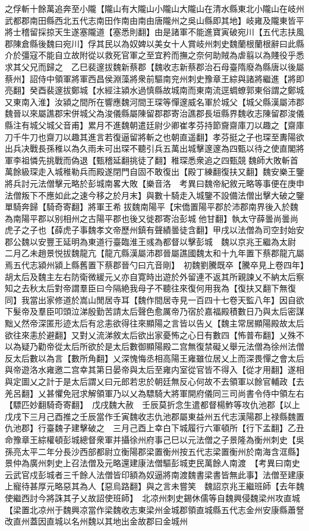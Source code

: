 之俘斬十餘萬追奔至小隴【隴山有大隴山小隴山大隴山在清水縣東北小隴山在岐州武都郡南田縣西北五代志南田作南由南由唐隴州之吳山縣即其地】岐雍及隴東皆平將士稽留採掠天生遂塞隴道【塞悉則翻】由是諸軍不能進寶寅破宛川【五代志扶風郡陳倉縣後魏曰宛川】俘其民以為奴婢以美女十人賞岐州刺史魏蘭根蘭根辭曰此縣介於彊寇不能自立故附從以救死官軍之至宜矜而撫之奈何助賊為虐翦以為賤役乎悉求其父兄而歸之　乙巳裴邃拔魏新蔡郡【魏收志新蔡郡治石母臺隋廢為縣唐以後屬蔡州】詔侍中領軍將軍西昌侯淵藻將衆前驅南兖州刺史豫章王綜與諸將繼進【將即亮翻】癸酉裴邃拔鄭城【水經注潁水過慎縣故城南而東南流逕蜩蟟郭東俗謂之鄭城又東南入淮】汝潁之間所在響應魏河間王琛等憚邃威名軍於城父【城父縣漢屬沛郡魏晉以來屬譙郡宋併城父為浚儀縣屬陳留郡郡寄治譙郡長垣縣界魏收志陳留郡浚儀縣注有城父城父音甫】累月不進魏朝遣廷尉少卿崔孝芬持節齎齋庫刀以趣之【齋庫刀千牛刀也齋刀以趣其進言若復逼留將斬之也朝直遥翻】孝芬挺之子也琛至夀陽欲出兵决戰長孫稚以為久雨未可出琛不聽引兵五萬出城擊邃邃為四甄以待之使直閣將軍李祖憐先挑戰而偽退【甄稽延翻挑徒了翻】稚琛悉衆追之四甄競魏師大敗斬首萬餘級琛走入城稚勒兵而殿遂閉門自固不敢復出【殿丁練翻復扶又翻】魏安樂王鑒將兵討元法僧擊元略於彭城南畧大敗【樂音洛　考異曰魏帝紀敘元略等事便在庚申法僧叛下不應如此之速今移之於月末】與數十騎走入城鑒不設備法僧出擊大破之鑒單騎奔歸【騎奇寄翻】將軍王希拔魏南陽平【宋僑置陽平郡於沛郡南界後入於魏為南陽平郡以别相州之古陽平郡也後又徙郡寄治彭城他甘翻】執太守薛曇尚曇尚虎子之子也【薛虎子事魏孝文帝歷州鎮有聲績曇徒含翻】甲戌以法僧為司空封始安郡公魏以安豐王延明為東道行臺臨淮王彧為都督以擊彭城　魏以京兆王繼為太尉　二月乙未趙景悦拔魏龍亢【龍亢縣漢屬沛郡晉屬譙國魏太和十九年置下蔡郡龍亢屬焉五代志潁州潁上縣舊置下蔡郡晉勺曰亢音剛】　初魏劉騰既卒【騰卒見上卷四年】胡太后及魏主左右防衛微緩元乂亦自寛時出遊於外留連不返其所親諫乂不納太后察知之去秋太后對帝謂羣臣曰今隔絶我母子不聽往來復何用我為【復扶又翻下無復同】我當出家修道於嵩山閒居寺耳【魏作間居寺見一百四十七卷天監八年】因自欲下髮帝及羣臣叩頭泣涕殷勤苦請太后聲色愈厲帝乃宿於嘉福殿積數日乃與太后密謀黜乂然帝深匿形迹太后有忿恚欲得往來顯陽之言皆以告乂【魏主常居顯陽殿故太后欲往來恚於避翻】又對乂流涕敘太后欲出家憂怖之心日有數四【怖普布翻】乂殊不以為疑乃勸帝從太后所欲於是太后數御顯陽殿二宫無復禁礙乂舉元法僧為徐州法僧反太后數以為言【數所角翻】乂深愧悔丞相高陽王雍雖位居乂上而深畏憚之會太后與帝遊洛水雍邀二宫幸其第日晏帝與太后至雍内室從官皆不得入【從才用翻】遂相與定圖乂之計于是太后謂乂曰元郎若忠於朝廷無反心何故不去領軍以餘官輔政【去羌呂翻】乂甚懼免冠求解領軍乃以乂為驃騎大將軍開府儀同三司尚書令侍中領左右【驃匹妙翻騎奇寄翻】　戊戌魏大赦　壬辰莫折念生遣都督楊鮓等攻仇池郡【以上戊戌下三月己酉推之壬辰當作壬寅魏收志仇池郡屬東益州五代志漢陽郡上禄縣魏置仇池郡】行臺魏子建擊破之　三月己酉上幸白下城履行六軍頓所【行下孟翻】乙丑命豫章王綜權頓彭城總督衆軍并攝徐州府事己巳以元法僧之子景隆為衡州刺史【吳孫亮太平二年分長沙西部都尉立衡陽郡梁置衡州按五代志梁置衡州於南海含洭縣】景仲為廣州刺史上召法僧及元略還建康法僧驅彭城吏民萬餘人南渡　【考異曰南史云武官戍彭城者三千餘人法僧皆印額為奴逼將南渡魏書梁書皆無此事】法僧至建康上寵待甚厚元略惡其為人【惡烏路翻】與之言未嘗笑　魏詔京兆王繼班師【去年魏使繼西討今將誅其子乂故詔使班師】　北凉州刺史錫休儒等自魏興侵魏梁州攻直城【梁置北凉州于魏興凉當作梁魏收志東梁州金城郡領直城縣五代志金州安康縣蕭詧改直州蓋因直城以名州魏以其地出金故郡曰金城州